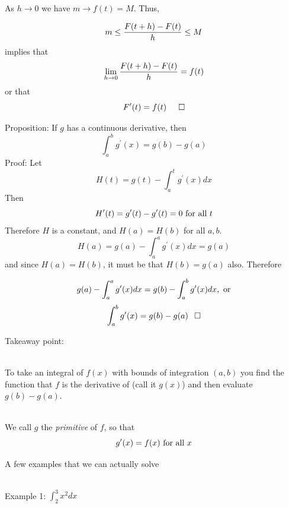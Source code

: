 \documentclass[10pt]{seminar}
\begin{document}
\begin{slide}
 \newslide
 
\begin{center}
  \end{center}

As $h\rightarrow 0$ we have $m\rightarrow f(t)=M$. Thus,

$$m\leq {{F(t+h)-F(t)}\over{h}}\leq M$$  implies that $$\lim_{h\rightarrow 0}{{F(t+h)-F(t)}\over{h}} =f(t)$$
or that $$F^\prime(t)=f(t) \hspace{.2in }\Box$$






\newslide

Proposition: If $g$ has a continuous derivative, then $$\int_a^b g^\prime(x)=g(b)-g(a)$$ Proof: Let $$H(t)=g(t)-\int_a^t g^\prime(x) dx$$ Then $$H^\prime(t)=g^\prime(t)-g^\prime(t)=0 \hbox{ for all } t$$ Therefore $H$ is a constant, and $H(a)=H(b)$ for all $a, b$.  $$H(a)=g(a)-\int_a^a g^\prime(x) dx= g(a)$$ and since $H(a)=H(b)$, it must be that $H(b)=g(a)$ also. Therefore

$$g(a)-\int_a^a g^\prime(x) dx=g(b)-\int_a^b g^\prime(x) dx, \hbox{ or} $$ $$\int_a^b g^\prime(x)=g(b)-g(a) \hspace{.1in}\Box$$

\newslide
Takeaway point:

\ \\ To take an integral of $f(x)$ with bounds of integration $(a,b)$ you find the function that $f$ is the derivative of (call it $g(x)$) and then evaluate $g(b)-g(a)$.

\ \\We call $g$ the \textit{primitive} of $f$, so that $$g^\prime(x)=f(x) \hbox{ for all } x$$

\newslide

A few examples that we can actually solve

\ \\Example 1: $\int_2^3 x^2 dx$


\end{slide}
\end{document}
